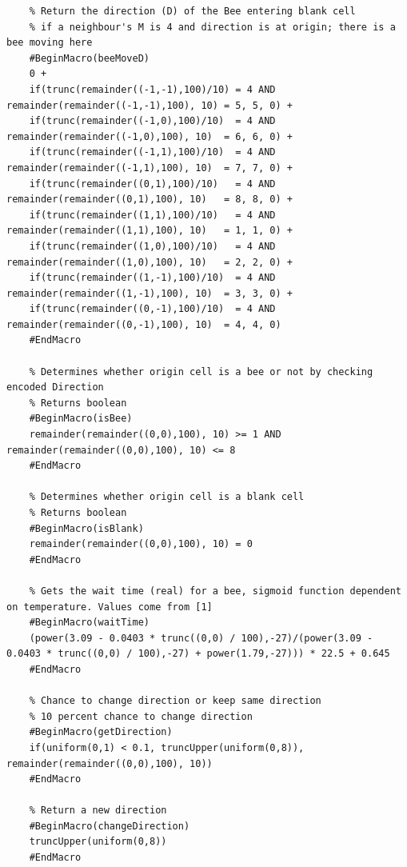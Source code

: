 \documentclass[conference,compsoc,onecolumn]{IEEEtran}
\begin{document}
\begin{lstlisting}
	% Return the direction (D) of the Bee entering blank cell
	% if a neighbour's M is 4 and direction is at origin; there is a bee moving here
	#BeginMacro(beeMoveD)
	0 + 
	if(trunc(remainder((-1,-1),100)/10) = 4 AND remainder(remainder((-1,-1),100), 10) = 5, 5, 0) + 
	if(trunc(remainder((-1,0),100)/10)  = 4 AND remainder(remainder((-1,0),100), 10)  = 6, 6, 0) + 
	if(trunc(remainder((-1,1),100)/10)  = 4 AND remainder(remainder((-1,1),100), 10)  = 7, 7, 0) + 
	if(trunc(remainder((0,1),100)/10)   = 4 AND remainder(remainder((0,1),100), 10)   = 8, 8, 0) + 
	if(trunc(remainder((1,1),100)/10)   = 4 AND remainder(remainder((1,1),100), 10)   = 1, 1, 0) + 
	if(trunc(remainder((1,0),100)/10)   = 4 AND remainder(remainder((1,0),100), 10)   = 2, 2, 0) + 
	if(trunc(remainder((1,-1),100)/10)  = 4 AND remainder(remainder((1,-1),100), 10)  = 3, 3, 0) + 
	if(trunc(remainder((0,-1),100)/10)  = 4 AND remainder(remainder((0,-1),100), 10)  = 4, 4, 0)
	#EndMacro
	
	% Determines whether origin cell is a bee or not by checking encoded Direction
	% Returns boolean
	#BeginMacro(isBee)
	remainder(remainder((0,0),100), 10) >= 1 AND remainder(remainder((0,0),100), 10) <= 8
	#EndMacro
	
	% Determines whether origin cell is a blank cell
	% Returns boolean
	#BeginMacro(isBlank)
	remainder(remainder((0,0),100), 10) = 0
	#EndMacro
	
	% Gets the wait time (real) for a bee, sigmoid function dependent on temperature. Values come from [1]
	#BeginMacro(waitTime)
	(power(3.09 - 0.0403 * trunc((0,0) / 100),-27)/(power(3.09 - 0.0403 * trunc((0,0) / 100),-27) + power(1.79,-27))) * 22.5 + 0.645
	#EndMacro
	
	% Chance to change direction or keep same direction
	% 10 percent chance to change direction
	#BeginMacro(getDirection)
	if(uniform(0,1) < 0.1, truncUpper(uniform(0,8)), remainder(remainder((0,0),100), 10))
	#EndMacro
	
	% Return a new direction
	#BeginMacro(changeDirection)
	truncUpper(uniform(0,8))
	#EndMacro
	

\end{lstlisting}
\end{document}

